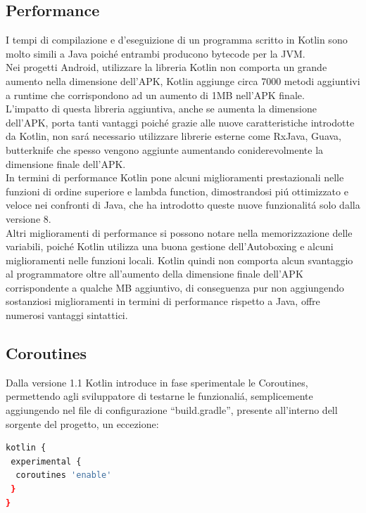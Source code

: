 \subsection{Performance}
I tempi di compilazione e d'eseguizione di un programma scritto in Kotlin sono molto simili a Java poich\'e entrambi producono bytecode per la JVM.\\
Nei progetti Android, utilizzare la libreria Kotlin non comporta un grande aumento nella dimensione dell'APK, Kotlin aggiunge circa 7000 metodi aggiuntivi a runtime che corrispondono ad un aumento di 1MB nell'APK finale.\\
L'impatto di questa libreria aggiuntiva, anche se aumenta la dimensione dell'APK, porta tanti vantaggi poich\'e grazie alle nuove caratteristiche introdotte da Kotlin, non sar\'a necessario utilizzare librerie esterne come RxJava, Guava, butterknife che spesso vengono aggiunte aumentando coniderevolmente la dimensione finale dell'APK.\\
In termini di performance Kotlin pone alcuni miglioramenti prestazionali nelle funzioni di ordine superiore e lambda function, dimostrandosi pi\'u ottimizzato e veloce nei confronti di Java, che ha introdotto queste nuove funzionalit\'a solo dalla versione 8.\\
Altri miglioramenti di performance si possono notare nella memorizzazione delle variabili, poich\'e Kotlin utilizza una buona gestione dell'Autoboxing e alcuni miglioramenti nelle funzioni locali.
Kotlin quindi non comporta alcun svantaggio al programmatore oltre all'aumento della dimensione finale dell'APK corrispondente a qualche MB aggiuntivo, di conseguenza pur non aggiungendo sostanziosi miglioramenti in termini di performance rispetto a Java, offre numerosi vantaggi sintattici.

\newpage




\subsection{Coroutines}
Dalla versione 1.1 Kotlin introduce in fase sperimentale le Coroutines, permettendo agli sviluppatore di testarne le funzionali\'a, semplicemente aggiungendo nel file di configurazione ``build.gradle'', presente all'interno dell sorgente del progetto, un eccezione:
\begin{lstlisting}[language=bash,caption={Gradle Coroutines }]
kotlin {
 experimental {
  coroutines 'enable'
 }
}
\end{lstlisting}

